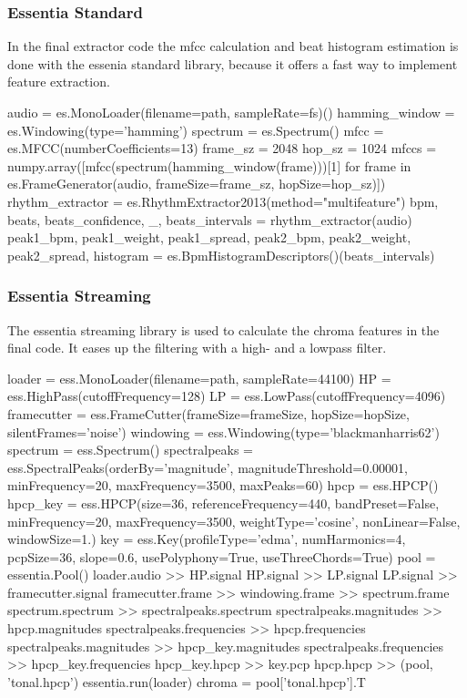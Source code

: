 \subsubsection{Essentia Standard}

In the final extractor code the mfcc calculation and beat histogram estimation is done with the essenia standard library, because it offers a fast way to implement feature extraction. 
\begin{pythonCode}
audio = es.MonoLoader(filename=path, sampleRate=fs)()
hamming_window = es.Windowing(type='hamming')
spectrum = es.Spectrum()
mfcc = es.MFCC(numberCoefficients=13)
frame_sz = 2048
hop_sz = 1024
mfccs = numpy.array([mfcc(spectrum(hamming_window(frame)))[1] 
	for frame in es.FrameGenerator(audio, frameSize=frame_sz, hopSize=hop_sz)])
rhythm_extractor = es.RhythmExtractor2013(method="multifeature")
bpm, beats, beats_confidence, _, beats_intervals = rhythm_extractor(audio)
peak1_bpm, peak1_weight, peak1_spread, peak2_bpm, peak2_weight, peak2_spread, histogram =
	es.BpmHistogramDescriptors()(beats_intervals)
\end{pythonCode}

\subsubsection{Essentia Streaming}

The essentia streaming library is used to calculate the chroma features in the final code. It eases up the filtering with a high- and a lowpass filter. 
\begin{pythonCode}
loader = ess.MonoLoader(filename=path, sampleRate=44100)
HP = ess.HighPass(cutoffFrequency=128)
LP = ess.LowPass(cutoffFrequency=4096)
framecutter = ess.FrameCutter(frameSize=frameSize, hopSize=hopSize, silentFrames='noise')
windowing = ess.Windowing(type='blackmanharris62')
spectrum = ess.Spectrum()
spectralpeaks = ess.SpectralPeaks(orderBy='magnitude', magnitudeThreshold=0.00001, 
	minFrequency=20, maxFrequency=3500, maxPeaks=60)
hpcp = ess.HPCP()
hpcp_key = ess.HPCP(size=36, referenceFrequency=440, bandPreset=False, minFrequency=20,
	maxFrequency=3500, weightType='cosine', nonLinear=False, windowSize=1.)
key = ess.Key(profileType='edma', numHarmonics=4, pcpSize=36, slope=0.6, 
	usePolyphony=True, useThreeChords=True)
pool = essentia.Pool()
loader.audio >> HP.signal
HP.signal >> LP.signal
LP.signal >> framecutter.signal    
framecutter.frame >> windowing.frame >> spectrum.frame
spectrum.spectrum >> spectralpeaks.spectrum
spectralpeaks.magnitudes >> hpcp.magnitudes
spectralpeaks.frequencies >> hpcp.frequencies
spectralpeaks.magnitudes >> hpcp_key.magnitudes
spectralpeaks.frequencies >> hpcp_key.frequencies
hpcp_key.hpcp >> key.pcp
hpcp.hpcp >> (pool, 'tonal.hpcp')
essentia.run(loader)
chroma = pool['tonal.hpcp'].T
\end{pythonCode}	

